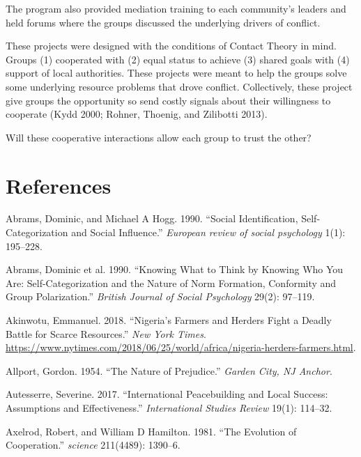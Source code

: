 \documentclass[11pt]{article}
\begin{document}
The program also provided mediation training to each community's leaders
and held forums where the groups discussed the underlying drivers of
conflict.

These projects were designed with the conditions of Contact Theory in
mind. Groups (1) cooperated with (2) equal status to achieve (3) shared
goals with (4) support of local authorities. These projects were meant
to help the groups solve some underlying resource problems that drove
conflict. Collectively, these project give groups the opportunity so
send costly signals about their willingness to cooperate (Kydd 2000;
Rohner, Thoenig, and Zilibotti 2013).

Will these cooperative interactions allow each group to trust the other?

\hypertarget{references}{%
\section*{References}\label{references}}

\hypertarget{refs}{}
\leavevmode\hypertarget{ref-abrams1990social}{}%
Abrams, Dominic, and Michael A Hogg. 1990. ``Social Identification,
Self-Categorization and Social Influence.'' \emph{European review of
social psychology} 1(1): 195--228.

\leavevmode\hypertarget{ref-abrams1990knowing}{}%
Abrams, Dominic et al. 1990. ``Knowing What to Think by Knowing Who You
Are: Self-Categorization and the Nature of Norm Formation, Conformity
and Group Polarization.'' \emph{British Journal of Social Psychology}
29(2): 97--119.

\leavevmode\hypertarget{ref-nyt2018nigeria}{}%
Akinwotu, Emmanuel. 2018. ``Nigeria's Farmers and Herders Fight a Deadly
Battle for Scarce Resources.'' \emph{New York Times}.
\url{https://www.nytimes.com/2018/06/25/world/africa/nigeria-herders-farmers.html}.

\leavevmode\hypertarget{ref-allport1954prejudice}{}%
Allport, Gordon. 1954. ``The Nature of Prejudice.'' \emph{Garden City,
NJ Anchor}.

\leavevmode\hypertarget{ref-autesserre2017international}{}%
Autesserre, Severine. 2017. ``International Peacebuilding and Local
Success: Assumptions and Effectiveness.'' \emph{International Studies
Review} 19(1): 114--32.

\leavevmode\hypertarget{ref-axelrod1981evolution}{}%
Axelrod, Robert, and William D Hamilton. 1981. ``The Evolution of
Cooperation.'' \emph{science} 211(4489): 1390--6.
\end{document}
